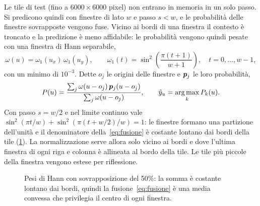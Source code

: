 Le tile di test (fino a $6000\times6000$ pixel) non entrano in memoria in un solo passo. Si
predicono quindi con finestre di lato $w$ e passo $s<w$, e le probabilità delle finestre
sovrapposte vengono fuse. Vicino ai bordi di una finestra il contesto è troncato e la
predizione è meno affidabile: le probabilità vengono quindi pesate con una finestra di Hann
separabile,
\begin{equation}
  \omega(u)=\omega_1(u_x)\,\omega_1(u_y),\qquad
  \omega_1(t)=\sin^2\!\left(\frac{\pi(t+1)}{w+1}\right),\quad t=0,\dots,w-1,
  \label{eq:hann}
\end{equation}
con un minimo di $10^{-3}$. Dette $o_j$ le origini delle finestre e $\bm{p}_j$ le loro
probabilità,
\begin{equation}
  P(u)=\frac{\sum_j\omega(u-o_j)\,\bm{p}_j(u-o_j)}{\sum_j\omega(u-o_j)},
  \qquad
  \hat y_u=\operatorname*{arg\,max}_kP_k(u).
  \label{eq:fusione}
\end{equation}
Con passo $s=w/2$ e nel limite continuo vale $\sin^2(\pi t/w)+\sin^2(\pi(t+w/2)/w)=1$: le
finestre formano una partizione dell'unità e il denominatore della~\eqref{eq:fusione} è
costante lontano dai bordi della tile (\cref{fig:hann}). La normalizzazione serve allora solo
vicino ai bordi e dove l'ultima finestra di ogni riga e colonna è allineata al bordo della tile.
Le tile più piccole della finestra vengono estese per riflessione.

\begin{figure}[t]
  \centering
  
  \caption[Fusione delle finestre con pesi di Hann]{Pesi di Hann con sovrapposizione del 50\%:
    la somma è costante lontano dai bordi, quindi la fusione~\eqref{eq:fusione} è una media
    convessa che privilegia il centro di ogni finestra.}
  \label{fig:hann}
\end{figure}
